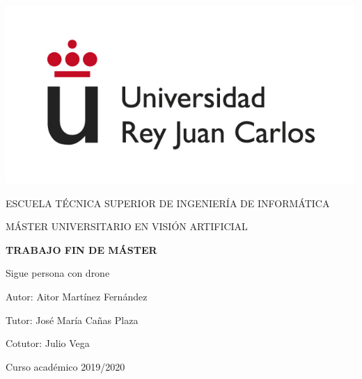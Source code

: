 \begin{titlepage}
	\begin{center}
		\vspace*{3mm}
		\begin{center}
			\includegraphics[width=0.4\linewidth]{figures/logo.jpg}
		\end{center}
		\vspace{6.5mm}
		
		\fontsize{15.5}{14}\selectfont ESCUELA TÉCNICA SUPERIOR DE INGENIERÍA DE INFORMÁTICA
		\vspace{13mm}
		
		\fontsize{14}{14}\selectfont MÁSTER UNIVERSITARIO EN VISIÓN ARTIFICIAL 
		
		\vspace{55pt}
		
		\fontsize{15.7}{14}\selectfont \textbf{TRABAJO FIN DE MÁSTER} 
		
		\vspace{20mm}
		\begin{huge}
		    Sigue persona con drone
		\end{huge}
		
		\vspace{20mm}
		
		\begin{large}
			Autor: Aitor Martínez Fernández
			
			Tutor: José María Cañas Plaza
			
			Cotutor: Julio Vega
			
			\vspace{10mm}
		\end{large}
		\begin{normalsize}
			Curso académico 2019/2020		
		\end{normalsize}
		\vspace{10mm}
		
	\end{center}
	
\end{titlepage}